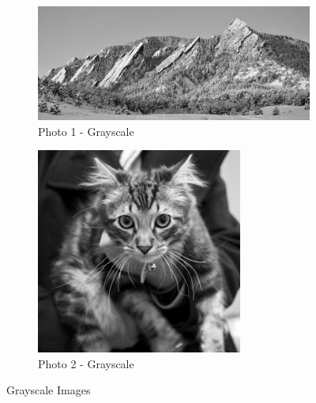 \documentclass[10pt]{report}
\begin{document}
    
    \begin{figure}[ht]
        \centering
        \begin{subfigure}{\textwidth}
            \centering
            \includegraphics[scale=0.7]{./img/gray1.png}
            \caption{Photo 1 - Grayscale}
            \label{fig:p1g}
        \end{subfigure}
        \begin{subfigure}{\textwidth}
            \centering
            \includegraphics[scale=0.7]{./img/gray2.png}
            \caption{Photo 2 - Grayscale}
            \label{fig:p2g}
        \end{subfigure}
        \caption{Grayscale Images}
        \label{fig:gray_images}
    \end{figure}
\newpage

\end{document}
